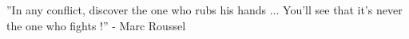 \author{
	Aghiles Djoudi, Rafik Zitouni, Nawel Zangar and Laurent George	\bigskip\\
	\ESIEE\\
	\ECE\\
	Email:   \{aghiles.djoudi, nawel.zangar, laurent.george\}@esiee.fr, rafik.zitouni@ece.fr
}

\epigraph{''In any conflict, discover the one who rubs his hands ... You'll see that it's never the one who fights !''  - Marc Roussel}{}

